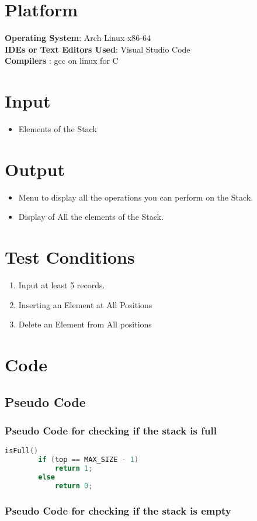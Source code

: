 \documentclass[11pt]{article}
\begin{document}
\section{Platform}
\textbf{Operating System}: Arch Linux x86-64 \\
\textbf{IDEs or Text Editors Used}: Visual Studio Code\\
\textbf{Compilers} : gcc on linux for C\\

\section{Input}

\begin{itemize}
	\item Elements of the Stack
\end{itemize}

\section{Output}
\begin{itemize}
	\item Menu to display all the operations you can perform on the Stack.
	\item Display of All the elements of the Stack. 
\end{itemize}

\section{Test Conditions}
\begin{enumerate}
	\item Input at least 5 records.
	\item Inserting an Element at All Positions
	\item Delete an Element from All positions
\end{enumerate}

\section{Code}
\subsection{Pseudo Code}
\subsubsection{Pseudo Code for checking if the stack is full}
\begin{lstlisting}[language=C]
	isFull()
		if (top == MAX_SIZE - 1)
			return 1;
		else
			return 0;
\end{lstlisting}\subsubsection{Pseudo Code for checking if the stack is empty}
\end{document}
